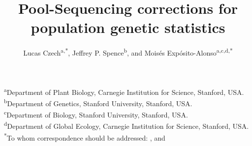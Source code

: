 \documentclass[letterpaper,fontsize=9pt,DIV=12]{scrartcl}
\title{Pool-Sequencing corrections for population genetic statistics}
\author{\orcid{0000-0002-1340-9644}Lucas Czech\textsuperscript{a,*}, \orcid{0000-0002-3199-1447}Jeffrey P. Spence\textsuperscript{b}, and \orcid{0000-0001-5711-0700}Moisés Expósito-Alonso\textsuperscript{a,c,d,*}}
\date{}
\newcommand{\beginsupplement}{%
    \setcounter{table}{0}
    \renewcommand{\thetable}{\arabic{table}}%
    \setcounter{figure}{0}
    \renewcommand{\thefigure}{\arabic{figure}}%
}
\begin{document}


\begingroup
\let\center\flushleft
\let\endcenter\endflushleft
\maketitle
\endgroup
\vspace*{-3.5em}
\textsuperscript{a}{Department of Plant Biology, Carnegie Institution for Science, Stanford, USA.\\}
\textsuperscript{b}{Department of Genetics, Stanford University, Stanford, USA.\\}
\textsuperscript{c}{Department of Biology, Stanford University, Stanford, USA.\\}
\textsuperscript{d}{Department of Global Ecology, Carnegie Institution for Science, Stanford, USA.\\}
\textsuperscript{*}{To whom correspondence should be addressed: \href{mailto:lczech@carnegiescience.edu}{\color{black}{lczech@carnegiescience.edu}},
and \href{mailto:moisesexpositoalonso@gmail.com}{\color{black}{moisesexpositoalonso@gmail.com}}}




\vspace*{2em}
\setlength{\fboxsep}{2em}
\vspace*{2em}
\end{document}
